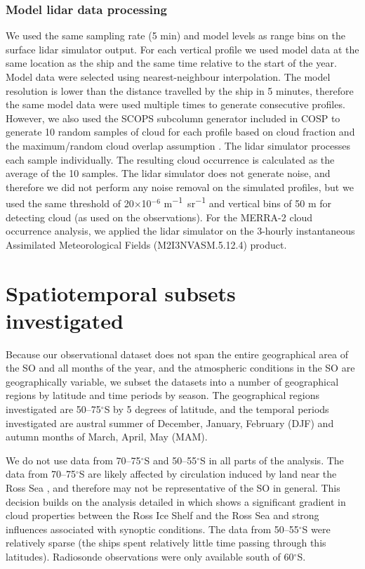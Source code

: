 \subsubsection{Model lidar data processing}

We used the same sampling rate (5 min) and model levels as range bins on the
surface lidar simulator output. For each vertical profile we used model data at
the same location as the ship and the same time relative to the start of the
year. Model data were selected using nearest-neighbour interpolation. The model
resolution is lower than the distance travelled by the ship in 5 minutes,
therefore the same model data were used multiple times to generate consecutive
profiles. However, we also used the SCOPS \citep{webb2001} subcolumn generator
included in COSP to generate 10 random samples of cloud for each profile based
on cloud fraction and the maximum/random cloud overlap assumption \citep{cosp}.
The lidar simulator processes each sample individually. The resulting cloud
occurrence is calculated as the average of the 10 samples. The lidar simulator
does not generate noise, and therefore we did not perform any noise removal on
the simulated profiles, but we used the same threshold of 20$\times$10$^{-6}$
\unit{m^{-1} sr^{-1}} and vertical bins of 50 m for detecting cloud (as used on
the observations). For the MERRA-2 cloud occurrence analysis, we applied the
lidar simulator on the 3-hourly instantaneous Assimilated Meteorological Fields
(M2I3NVASM.5.12.4) product.

\section{Spatiotemporal subsets investigated}
\label{sec:domains}

Because our observational dataset does not span the entire geographical area of
the SO and all months of the year, and the atmospheric conditions in the SO are
geographically variable, we subset the datasets into a number of geographical
regions by latitude and time periods by season. The geographical regions
investigated are 50--75$^\circ$S by 5 degrees of latitude, and the temporal
periods investigated are austral summer of December, January, February (DJF)
and autumn months of March, April, May (MAM).

We do not use data from 70--75$^\circ$S and 50--55$^\circ$S in all parts of
the analysis.  The data from 70--75$^\circ$S are likely affected by
circulation induced by land near the Ross Sea \citep{coggins2014}, and
therefore may not be representative of the SO in general. This decision builds
on the analysis detailed in \cite{jolly2018} which shows a significant gradient
in cloud properties between the Ross Ice Shelf and the Ross Sea and strong
influences associated with synoptic conditions. The data from 50--55$^\circ$S
were relatively sparse (the ships spent relatively little time passing through
this latitudes). Radiosonde observations were only available south of
60$^\circ$S.

